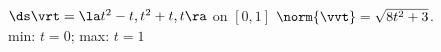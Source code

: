 {$\ds \vrt = \la t^2-t,t^2+t,t \ra$ on $[0,1]$
}
{
$\norm{\vvt} = \sqrt{8t^2+3}$. \\
min: $t=0$; max: $t=1$
}